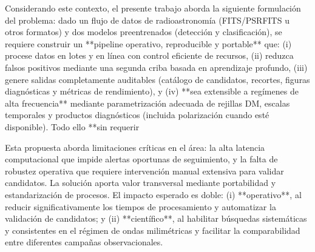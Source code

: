 \medskip

Considerando este contexto, el presente trabajo aborda la siguiente formulación del problema: dado un flujo de datos de radioastronomía (FITS/PSRFITS u otros formatos) y dos modelos preentrenados (detección y clasificación), se requiere construir un **pipeline operativo, reproducible y portable** que: (i) procese datos en lotes y en línea con control eficiente de recursos, (ii) reduzca falsos positivos mediante una segunda criba basada en aprendizaje profundo, (iii) genere salidas completamente auditables (catálogo de candidatos, recortes, figuras diagnósticas y métricas de rendimiento), y (iv) **sea extensible a regímenes de alta frecuencia** mediante parametrización adecuada de rejillas DM, escalas temporales y productos diagnósticos (incluida polarización cuando esté disponible). Todo ello **sin requerir 

\medskip

Esta propuesta aborda limitaciones críticas en el área: la alta latencia computacional que impide alertas oportunas de seguimiento, y la falta de robustez operativa que requiere intervención manual extensiva para validar candidatos. La solución aporta valor transversal mediante portabilidad y estandarización de procesos. El impacto esperado es doble: (i) **operativo**, al reducir significativamente los tiempos de procesamiento y automatizar la validación de candidatos; y (ii) **científico**, al habilitar búsquedas sistemáticas y consistentes en el régimen de ondas milimétricas y facilitar la comparabilidad entre diferentes campañas observacionales.

